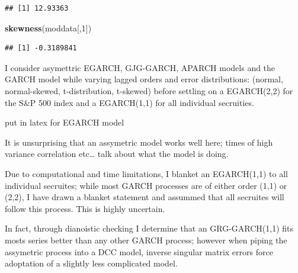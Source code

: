 \documentclass[]{elsarticle} %
\newenvironment{Shaded}{\begin{snugshade}}{\end{snugshade}}
\newcommand{\KeywordTok}[1]{\textcolor[rgb]{0.13,0.29,0.53}{\textbf{{#1}}}}
\newcommand{\DecValTok}[1]{\textcolor[rgb]{0.00,0.00,0.81}{{#1}}}
\newcommand{\NormalTok}[1]{{#1}}
\begin{document}
\begin{verbatim}
## [1] 12.93363
\end{verbatim}

\begin{Shaded}
\begin{Highlighting}[]
\KeywordTok{skewness}\NormalTok{(moddata[,}\DecValTok{1}\NormalTok{])}
\end{Highlighting}
\end{Shaded}

\begin{verbatim}
## [1] -0.3189841
\end{verbatim}

I consider asymettric EGARCH, GJG-GARCH, APARCH models and the GARCH
model while varying lagged orders and error distributions: (normal,
normal-skewed, t-distribution, t-skewed) before settling on a
EGARCH(2,2) for the S\&P 500 index and a EGARCH(1,1) for all individual
secruities.

put in latex for EGARCH model

It is unsurprising that an assymetric model works well here; times of
high variance correlation etc\ldots{} talk about what the model is
doing.

Due to computational and time limitations, I blanket an EGARCH(1,1) to
all individual secruites; while most GARCH processes are of either order
(1,1) or (2,2), I have drawn a blanket statement and assummed that all
secruites will follow this process. This is highly uncertain.

In fact, through dianoistic checking I determine that an GRG-GARCH(1,1)
fits mosts series better than any other GARCH process; however when
piping the assymetric process into a DCC model, inverse singular matrix
errors force adoptation of a slightly less complicated model.
\end{document}
